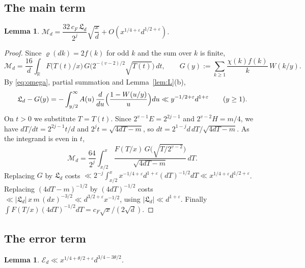 \documentclass[11pt]{amsart}
\newtheorem{lemma}[theorem]{Lemma}
\theoremstyle{remark}
\theoremstyle{definition}
\numberwithin{equation}{section}
\newcommand{\R}{\mathbb{R}}
\newcommand{\eps}{\varepsilon}
\newcommand{\Lf}{\mathfrak{L}}
\begin{document}
\subsection{The main term}

\begin{lemma}\label{lem:main}
$\mathcal M_d=\dfrac{32\,c_F\,\Lf_d}{2^j}\sqrt{\dfrac xd}+O(x^{1/4+\eps}d^{1/2+\eps})$.
\end{lemma}

\begin{proof}
Since $\varrho(dk)=2f(k)$ for odd $k$ and the sum over $k$ is finite,
\[
\mathcal M_d=\frac{16}{d}\int_\R F\bigl(T(t)/x\bigr)\,G\bigl(2^{-(v-2)/2}\sqrt{T(t)}\bigr)\,dt,\qquad G(y):=\sum_{k\ge1}\frac{\chi(k)f(k)}k\,W(k/y).
\]
By \eqref{eq:omega}, partial summation and Lemma~\ref{lem:L}(b),
\[
\Lf_d-G(y)=-\int_{y/2}^\infty A(u)\,\frac{d}{du}\Bigl(\frac{1-W(u/y)}u\Bigr)du\ll y^{-1/2+\eps}d^{1+\eps}\qquad(y\ge1).
\]
On $t>0$ we substitute $T=T(t)$. Since $2^{v-1}E=2^{2j-1}$ and $2^{v-2}H=m/4$, we have $dT/dt=2^{2j-1}t/d$ and $2^{j}t=\sqrt{4dT-m}$, so $dt=2^{1-j}d\,dT/\sqrt{4dT-m}$. As the integrand is even in $t$,
\[
\mathcal M_d=\frac{64}{2^j}\int_{x/2}^x\frac{F(T/x)\,G\bigl(\sqrt{T/2^{v-2}}\bigr)}{\sqrt{4dT-m}}\,dT .
\]
Replacing $G$ by $\Lf_d$ costs $\ll2^{-j}\int_{x/2}^xx^{-1/4+\eps}d^{1+\eps}(dT)^{-1/2}dT\ll x^{1/4+\eps}d^{1/2+\eps}$. Replacing $(4dT-m)^{-1/2}$ by $(4dT)^{-1/2}$ costs $\ll|\Lf_d|\,x\,m\,(dx)^{-3/2}\ll d^{3/2+\eps}x^{-1/2}$, using $|\Lf_d|\ll d^{1+\eps}$. Finally $\int F(T/x)(4dT)^{-1/2}dT=c_F\sqrt x/(2\sqrt d)$.
\end{proof}

\subsection{The error term}

\begin{lemma}\label{lem:error}
$\mathcal E_d\ll x^{1/4+\theta/2+\eps}d^{3/4-3\theta/2}$.
\end{lemma}
\end{document}
